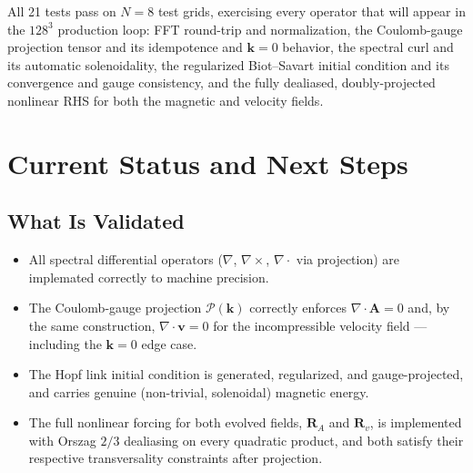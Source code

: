 \documentclass[11pt, a4paper]{article}
\newcommand{\curl}{\nabla \times}
\renewcommand{\div}{\nabla \cdot}
\begin{document}
All 21 tests pass on $N=8$ test grids, exercising every operator that will
appear in the $128^3$ production loop: FFT round-trip and normalization,
the Coulomb-gauge projection tensor and its idempotence and $\mathbf{k}=0$
behavior, the spectral curl and its automatic solenoidality, the
regularized Biot--Savart initial condition and its convergence and gauge
consistency, and the fully dealiased, doubly-projected nonlinear RHS for
both the magnetic and velocity fields.

\section{Current Status and Next Steps}
\label{sec:status}

\subsection{What Is Validated}
\begin{itemize}
    \item All spectral differential operators ($\nabla$, $\curl$,
    $\div$ via projection) are implemated correctly to machine precision.
    \item The Coulomb-gauge projection $\mathcal{P}(\mathbf{k})$ correctly
    enforces $\div\mathbf{A}=0$ and, by the same construction,
    $\div\mathbf{v}=0$ for the incompressible velocity field --- including
    the $\mathbf{k}=0$ edge case.
    \item The Hopf link initial condition is generated, regularized, and
    gauge-projected, and carries genuine (non-trivial, solenoidal)
    magnetic energy.
    \item The full nonlinear forcing for both evolved fields,
    $\mathbf{R}_A$ and $\mathbf{R}_v$, is implemented with Orszag $2/3$
    dealiasing on every quadratic product, and both satisfy their
    respective transversality constraints after projection.
\end{itemize}
\end{document}
